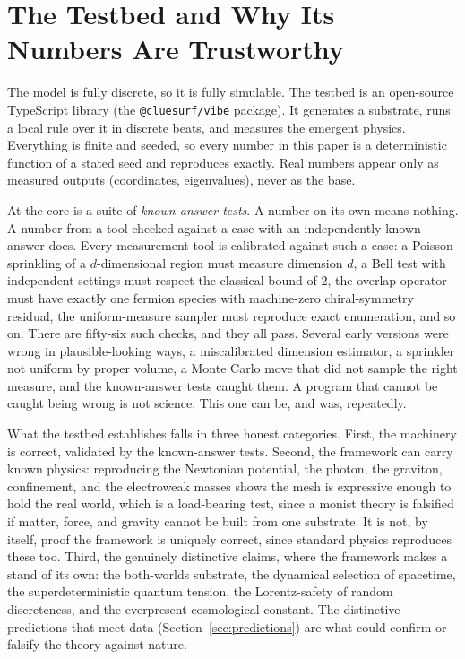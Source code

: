 \section{The Testbed and Why Its Numbers Are Trustworthy}
\label{sec:testbed}

The model is fully discrete, so it is fully simulable. The testbed is an open-source
TypeScript library (the \texttt{@cluesurf/vibe} package). It generates a substrate,
runs a local rule over it in discrete beats, and measures the emergent physics.
Everything is finite and seeded, so every number in this paper is a deterministic
function of a stated seed and reproduces exactly. Real numbers appear only as measured
outputs (coordinates, eigenvalues), never as the base.

At the core is a suite of \emph{known-answer tests}. A number on its own means
nothing. A number from a tool checked against a case with an independently known answer
does. Every measurement tool is calibrated against such a case: a Poisson sprinkling of
a $d$-dimensional region must measure dimension $d$, a Bell test with independent
settings must respect the classical bound of $2$, the overlap operator must have exactly
one fermion species with machine-zero chiral-symmetry residual, the uniform-measure
sampler must reproduce exact enumeration, and so on. There are fifty-six such checks,
and they all pass. Several early versions were wrong in plausible-looking ways, a
miscalibrated dimension estimator, a sprinkler not uniform by proper volume, a Monte
Carlo move that did not sample the right measure, and the known-answer tests caught them.
A program that cannot be caught being wrong is not science. This one can be, and was,
repeatedly.

What the testbed establishes falls in three honest categories. First, the machinery is
correct, validated by the known-answer tests. Second, the framework can carry known
physics: reproducing the Newtonian potential, the photon, the graviton, confinement,
and the electroweak masses shows the mesh is expressive enough to hold the real world,
which is a load-bearing test, since a monist theory is falsified if matter, force, and
gravity cannot be built from one substrate. It is not, by itself, proof the framework
is uniquely correct, since standard physics reproduces these too. Third, the genuinely
distinctive claims, where the framework makes a stand of its own: the both-worlds
substrate, the dynamical selection of spacetime, the superdeterministic quantum
tension, the Lorentz-safety of random discreteness, and the everpresent cosmological
constant. The distinctive predictions that meet data (Section~\ref{sec:predictions})
are what could confirm or falsify the theory against nature.
